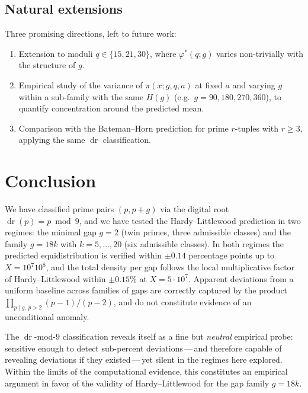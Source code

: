 \documentclass[11pt]{amsart}
\theoremstyle{plain}
\theoremstyle{definition}
\theoremstyle{remark}
\DeclareMathOperator{\dr}{dr}
\begin{document}
\subsection{Natural extensions}

Three promising directions, left to future work:
\begin{enumerate}
\item Extension to moduli $q \in \{15, 21, 30\}$, where
  $\varphi^*(q;g)$ varies non-trivially with the structure of $g$.
\item Empirical study of the variance of $\pi(x;g,q,a)$ at fixed $a$
  and varying $g$ within a sub-family with the same $H(g)$
  (e.g.~$g=90,180,270,360$), to quantify concentration around the
  predicted mean.
\item Comparison with the Bateman--Horn prediction for prime $r$-tuples
  with $r \ge 3$, applying the same $\dr$ classification.
\end{enumerate}

\section{Conclusion}\label{sec:conclusion}

We have classified prime pairs $(p,p+g)$ via the digital root
$\dr(p) = p \bmod 9$, and we have tested the Hardy--Littlewood
prediction in two regimes: the minimal gap $g=2$ (twin primes, three
admissible classes) and the family $g=18k$ with $k=5,\ldots,20$ (six
admissible classes). In both regimes the predicted equidistribution
is verified within $\pm 0.14$ percentage points up to
$X = 10^7$\textendash$10^8$, and the total density per gap follows the
local multiplicative factor of Hardy--Littlewood within $\pm 0.15\%$
at $X = 5 \cdot 10^7$. Apparent deviations from a uniform baseline
across families of gaps are correctly captured by the product
$\prod_{p \mid g,\,p>2}(p-1)/(p-2)$, and do not constitute evidence
of an unconditional anomaly.

The $\dr$-mod-$9$ classification reveals itself as a fine but
\emph{neutral} empirical probe: sensitive enough to detect
sub-percent deviations\,---\,and therefore capable of revealing
deviations if they existed\,---\,yet silent in the regimes here
explored. Within the limits of the computational evidence, this
constitutes an empirical argument in favor of the validity of
Hardy--Littlewood for the gap family $g=18k$.
\end{document}
